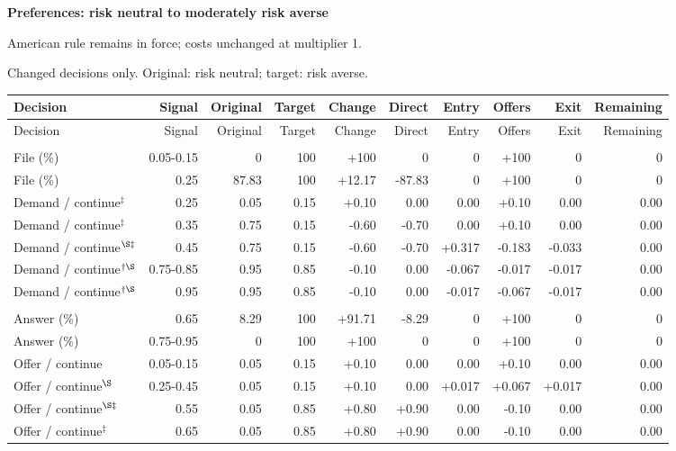 \documentclass[10pt]{article}
\begin{document}
{\large\bfseries Preferences: risk neutral to moderately risk averse}\par
American rule remains in force; costs unchanged at multiplier 1.\par
{\small Changed decisions only. Original: risk neutral; target: risk averse.}\par
{\small\setlength{\tabcolsep}{3pt}\begin{longtable}{@{}>{\raggedright\arraybackslash}p{1.65in}rrrrrrrrr@{}}
\toprule Decision & Signal & Original & Target & Change & Direct & Entry & Offers & Exit & Remaining \\\midrule\endfirsthead
\toprule Decision & Signal & Original & Target & Change & Direct & Entry & Offers & Exit & Remaining \\\midrule\endhead
\bottomrule\endfoot
\multicolumn{10}{@{}l}{\textbf{Plaintiff}}\\
File (\%) & 0.05-0.15 & 0 & 100 & +100 & 0 & 0 & +100 & 0 & 0\\
File (\%) & 0.25 & 87.83 & 100 & +12.17 & -87.83 & 0 & +100 & 0 & 0\\
Demand / continue$^{\ddagger}$ & 0.25 & 0.05 & 0.15 & +0.10 & 0.00 & 0.00 & +0.10 & 0.00 & 0.00\\
Demand / continue$^{\ddagger}$ & 0.35 & 0.75 & 0.15 & -0.60 & -0.70 & 0.00 & +0.10 & 0.00 & 0.00\\
Demand / continue$^{\S\ddagger}$ & 0.45 & 0.75 & 0.15 & -0.60 & -0.70 & +0.317 & -0.183 & -0.033 & 0.00\\
Demand / continue$^{\dagger\S}$ & 0.75-0.85 & 0.95 & 0.85 & -0.10 & 0.00 & -0.067 & -0.017 & -0.017 & 0.00\\
Demand / continue$^{\dagger\S}$ & 0.95 & 0.95 & 0.85 & -0.10 & 0.00 & -0.017 & -0.067 & -0.017 & 0.00\\
\multicolumn{10}{@{}l}{\textbf{Defendant}}\\
Answer (\%) & 0.65 & 8.29 & 100 & +91.71 & -8.29 & 0 & +100 & 0 & 0\\
Answer (\%) & 0.75-0.95 & 0 & 100 & +100 & 0 & 0 & +100 & 0 & 0\\
Offer / continue & 0.05-0.15 & 0.05 & 0.15 & +0.10 & 0.00 & 0.00 & +0.10 & 0.00 & 0.00\\
Offer / continue$^{\S}$ & 0.25-0.45 & 0.05 & 0.15 & +0.10 & 0.00 & +0.017 & +0.067 & +0.017 & 0.00\\
Offer / continue$^{\S\ddagger}$ & 0.55 & 0.05 & 0.85 & +0.80 & +0.90 & 0.00 & -0.10 & 0.00 & 0.00\\
Offer / continue$^{\ddagger}$ & 0.65 & 0.05 & 0.85 & +0.80 & +0.90 & 0.00 & -0.10 & 0.00 & 0.00\\
\end{longtable}}
\end{document}
